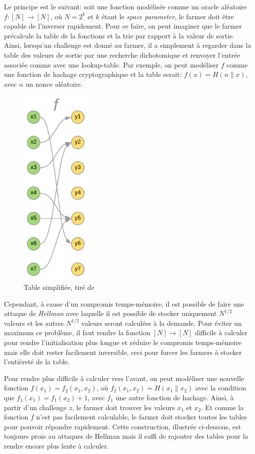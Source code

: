 Le principe est le suivant: soit une fonction modélisée comme un oracle aléatoire $f: [N] \rightarrow [N]$, où $N=2^k$ et $k$ étant le \emph{space parameter}, le farmer doit être capable de l'inverser rapidement. Pour ce faire, on peut imaginer que le farmer précalcule la table de la fonctions et la trie par rapport à la valeur de sortie. Ainsi, lorsqu'un challenge est donné au farmer, il a simplement à regarder dans la table des valeurs de sortie par une recherche dichotomique et renvoyer l'entrée associée comme avec une lookup-table. Par exemple, on peut modéliser $f$ comme une fonction de hachage cryptographique et la table serait: $f(x) = H(n\|x)$, avec $n$ un nonce aléatoire. \cite{chia:construction}

\begin{figure}[H]
  \centering
  \includegraphics[width=3.5cm]{images/pospace_1.png}
  \caption{Table simplifiée, tiré de \cite{chia:construction}}
\end{figure}

Cependant, à cause d'un compromis temps-mémoire, il est possible de faire une attaque de \emph{Hellman} avec laquelle il est possible de stocker uniquement $N^{1/2}$ valeurs et les autres $N^{1/2}$ valeurs seront calculées à la demande. Pour éviter un maximum ce problème, il faut rendre la fonction $[N] \rightarrow [N]$ difficile à calculer pour rendre l'initialisation plus longue et réduire le compromis temps-mémoire mais elle doit rester facilement inversible, ceci pour forcer les farmers à stocker l'entièreté de la table. \cite{chia:construction}

Pour rendre plus difficile à calculer vers l'avant, on peut modéliser une nouvelle fonction $f(x_1)=f_2(x_1,x_2)$, où $f_2(x_1,x_2)=H(x_1\|x_2)$ avec la condition que $f_1(x_1)=f_1(x_2)+1$, avec $f_1$ une autre fonction de hachage. Ainsi, à partir d'un challenge $z$, le farmer doit trouver les valeurs $x_1$ et $x_2$. Et comme la fonction $f$ n'est pas facilement calculable, le farmer doit stocker toutes les tables pour pouvoir répondre rapidement. Cette construction, illustrée ci-dessous, est toujours proie au attaques de Hellman mais il suffi de rajouter des tables pour la rendre encore plus lente à calculer. \cite{chia:construction}

